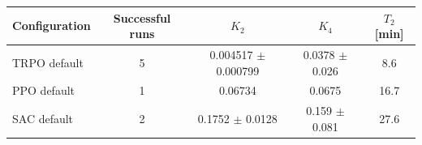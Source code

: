 \begin{tabular}{lcccc}
\toprule
Configuration & Successful runs & $K_2$ & $K_4$ & $T_2$ [min] \\
\midrule
TRPO default & 5 & 0.004517 $\pm$ 0.000799 & 0.0378 $\pm$ 0.026 & 8.6 \\
PPO default & 1 & 0.06734 & 0.0675 & 16.7 \\
SAC default & 2 & 0.1752 $\pm$ 0.0128 & 0.159 $\pm$ 0.081 & 27.6 \\
\bottomrule
\end{tabular}
